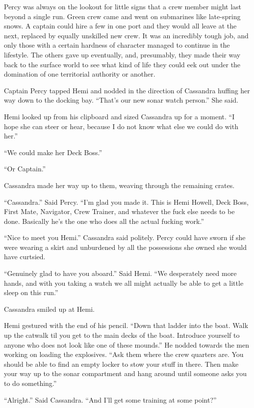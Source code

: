 \documentclass[]{scrbook}
\begin{document}
Percy was always on the lookout for little signs that a crew member
might last beyond a single run. Green crew came and went on submarines
like late-spring snows. A captain could hire a few in one port and they
would all leave at the next, replaced by equally unskilled new crew. It
was an incredibly tough job, and only those with a certain hardness of
character managed to continue in the lifestyle. The others gave up
eventually, and, presumably, they made their way back to the surface
world to see what kind of life they could eek out under the domination
of one territorial authority or another.

Captain Percy tapped Hemi and nodded in the direction of Cassandra
huffing her way down to the docking bay. ``That's our new sonar watch
person.'' She said.

Hemi looked up from his clipboard and sized Cassandra up for a moment.
``I hope she can steer or hear, because I do not know what else we could
do with her.''

``We could make her Deck Boss.''

``Or Captain.''

Cassandra made her way up to them, weaving through the remaining crates.

``Cassandra.'' Said Percy. ``I'm glad you made it. This is Hemi Howell,
Deck Boss, First Mate, Navigator, Crew Trainer, and whatever the fuck
else needs to be done. Basically he's the one who does all the actual
fucking work.''

``Nice to meet you Hemi.'' Cassandra said politely. Percy could have
sworn if she were wearing a skirt and unburdened by all the possessions
she owned she would have curtsied.

``Genuinely glad to have you aboard.'' Said Hemi. ``We desperately need
more hands, and with you taking a watch we all might actually be able to
get a little sleep on this run.''

Cassandra smiled up at Hemi.

Hemi gestured with the end of his pencil. ``Down that ladder into the
boat. Walk up the catwalk til you get to the main decks of the boat.
Introduce yourself to anyone who does not look like one of these
mounds.'' He nodded towards the men working on loading the explosives.
``Ask them where the crew quarters are. You should be able to find an
empty locker to stow your stuff in there. Then make your way up to the
sonar compartment and hang around until someone asks you to do
something.''

``Alright.'' Said Cassandra. ``And I'll get some training at some
point?''
\end{document}
